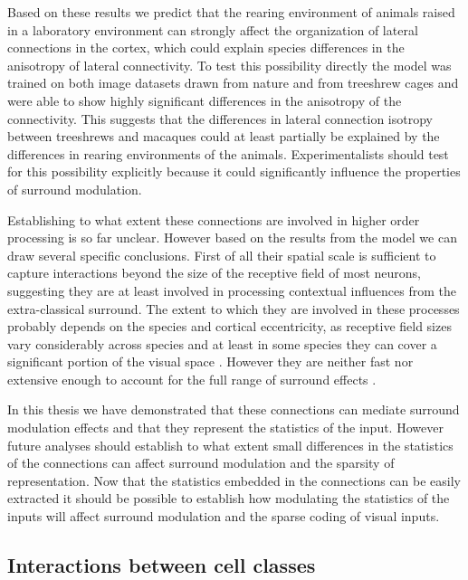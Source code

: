 Based on these results we predict that the rearing environment of
animals raised in a laboratory environment can strongly affect the
organization of lateral connections in the cortex, which could explain
species differences in the anisotropy of lateral connectivity. To test
this possibility directly the model was trained on both image datasets
drawn from nature and from treeshrew cages and were able to show
highly significant differences in the anisotropy of the
connectivity. This suggests that the differences in lateral connection
isotropy between treeshrews \citep{Bosking1997} and macaques
\citep{Angelucci2002} could at least partially be explained by the
differences in rearing environments of the animals. Experimentalists
should test for this possibility explicitly because it could
significantly influence the properties of surround modulation.

Establishing to what extent these connections are involved in higher
order processing is so far unclear. However based on the results from
the model we can draw several specific conclusions. First of all their
spatial scale is sufficient to capture interactions beyond the size of
the receptive field of most neurons, suggesting they are at least
involved in processing contextual influences from the extra-classical
surround. The extent to which they are involved in these processes
probably depends on the species and cortical eccentricity, as
receptive field sizes vary considerably across species and at least in
some species they can cover a significant portion of the visual space
\citep{Bosking1997}. However they are neither fast nor extensive
enough to account for the full range of surround effects
\citep{Bair2003}.

In this thesis we have demonstrated that these connections can mediate
surround modulation effects and that they represent the statistics of
the input. However future analyses should establish to what extent
small differences in the statistics of the connections can affect
surround modulation and the sparsity of representation. Now that the
statistics embedded in the connections can be easily extracted it
should be possible to establish how modulating the statistics of the
inputs will affect surround modulation and the sparse coding of visual
inputs.

\subsection{Interactions between cell classes}

